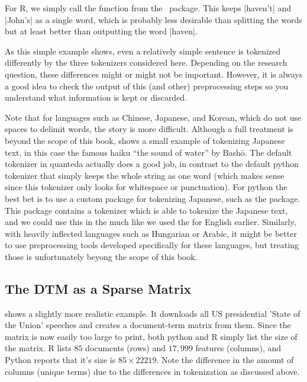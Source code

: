 For R, we simply call the  function from the \quanteda\ package.
This keeps |haven't| and |John's| as a single word, which is probably less desirable than splitting the words
but at least better than outputting the word |haven|.

As this simple example shows, even a relatively simple sentence is tokenized differently by the three tokenizers considered here.
Depending on the research question, these differences might or might not be important.
However, it is always a good idea to check the output of this (and other) preprocessing steps so you understand
what information is kept or discarded.


Note that for languages such as Chinese, Japanese, and Korean, which do not use spaces to delimit words, the story is more difficult.
Although a full treatment is beyond the scope of this book,  shows a small example of tokenizing Japanese text,
in this case the famous haiku ``the sound of water'' by Bash\={o}.
The default tokenizer in quanteda actually does a good job, in contrast to the default python tokenizer
that simply keeps the whole string as one word
(which makes sense since this tokenizer only looks for whitespace or punctuation).
For python the best bet is to use a custom package for tokenizing Japanese, such as the  package.
This package contains a tokenizer which is able to tokenize the Japanese text, and we could use this in the 
much like we used the  for English earlier.
Similarly, with heavily inflected languages such as Hungarian or Arabic,
it might be better to use preprocessing tools developed specifically for these languages, but treating those is unfortunately
beyong the scope of this book. 


\subsection{The DTM as a Sparse Matrix}


 shows a slightly more realistic example.
It downloads all US presidential 'State of the Union' speeches and creates a document-term matrix from them.
Since the matrix is now easily too large to print, both python and R simply list the size of the matrix.
R lists $85$ documents (rows) and $17,999$ features (columns), and Python reports that it's size is $85\times22219$.
Note the difference in the amount of columns (unique terms) due to the differences in tokenization as discussed above. 

